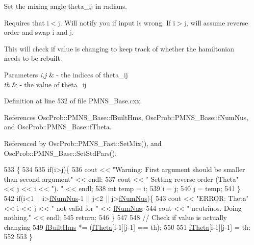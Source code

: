 Set the mixing angle theta\+\_\+ij in radians.

Requires that i$<$j. Will notify you if input is wrong. If i$>$j, will assume reverse order and swap i and j.

This will check if value is changing to keep track of whether the hamiltonian needs to be rebuilt.


\begin{DoxyParams}{Parameters}
{\em i,j} & -\/ the indices of theta\+\_\+ij \\
\hline
{\em th} & -\/ the value of theta\+\_\+ij \\
\hline
\end{DoxyParams}


Definition at line 532 of file P\+M\+N\+S\+\_\+\+Base.\+cxx.



References Osc\+Prob\+::\+P\+M\+N\+S\+\_\+\+Base\+::f\+Built\+Hms, Osc\+Prob\+::\+P\+M\+N\+S\+\_\+\+Base\+::f\+Num\+Nus, and Osc\+Prob\+::\+P\+M\+N\+S\+\_\+\+Base\+::f\+Theta.



Referenced by Osc\+Prob\+::\+P\+M\+N\+S\+\_\+\+Fast\+::\+Set\+Mix(), and Osc\+Prob\+::\+P\+M\+N\+S\+\_\+\+Base\+::\+Set\+Std\+Pars().


\begin{DoxyCode}
533 \{
534 
535   \textcolor{keywordflow}{if}(i>j)\{
536     cout << \textcolor{stringliteral}{"Warning: First argument should be smaller than second argument"} << endl;
537     cout << \textcolor{stringliteral}{"         Setting reverse order (Theta"} << j << i << \textcolor{stringliteral}{"). "} << endl;
538     \textcolor{keywordtype}{int} temp = i;
539     i = j;
540     j = temp;
541   \}
542   \textcolor{keywordflow}{if}(i<1 || i>\hyperlink{classOscProb_1_1PMNS__Base_a24bb74bed63569dfe88b18fa6a08060e}{fNumNus}-1 || j<2 || j>\hyperlink{classOscProb_1_1PMNS__Base_a24bb74bed63569dfe88b18fa6a08060e}{fNumNus})\{
543     cout << \textcolor{stringliteral}{"ERROR: Theta"} << i << j << \textcolor{stringliteral}{" not valid for "} << \hyperlink{classOscProb_1_1PMNS__Base_a24bb74bed63569dfe88b18fa6a08060e}{fNumNus};
544     cout << \textcolor{stringliteral}{" neutrinos. Doing nothing."} << endl;
545     \textcolor{keywordflow}{return};
546   \}
547 
548   \textcolor{comment}{// Check if value is actually changing}
549   \hyperlink{classOscProb_1_1PMNS__Base_a9ac3cadeac8db1b90f3152f476244780}{fBuiltHms} *= (\hyperlink{classOscProb_1_1PMNS__Base_a1976887cd658dd86b2336c181f1470b4}{fTheta}[i-1][j-1] == th);
550 
551   \hyperlink{classOscProb_1_1PMNS__Base_a1976887cd658dd86b2336c181f1470b4}{fTheta}[i-1][j-1] = th;
552 
553 \}
\end{DoxyCode}
\mbox{\label{classOscProb_1_1PMNS__Base_aba565962a440d14bee7a2a96d2eca2c5}} 
